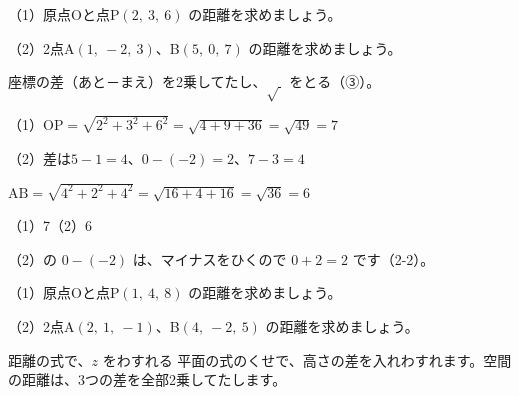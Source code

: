 \begin{reidai}
（1）原点Oと点P$(2,\ 3,\ 6)$ の距離を求めましょう。\par
（2）2点A$(1,\ -2,\ 3)$、B$(5,\ 0,\ 7)$ の距離を求めましょう。\par
\kangaekata 座標の差（あと－まえ）を2乗してたし、$\sqrt{\ }$ をとる（③）。\par
\shiki（1）$\mathrm{OP}=\sqrt{2^2+3^2+6^2}=\sqrt{4+9+36}=\sqrt{49}=7$\par
\hspace*{2.6\zw}（2）差は\enspace $5-1=4$、\enspace $0-(-2)=2$、\enspace $7-3=4$\par
\hspace*{4.6\zw}$\mathrm{AB}=\sqrt{4^2+2^2+4^2}=\sqrt{16+4+16}=\sqrt{36}=6$\par
\kotae （1）7\quad（2）6
\end{reidai}
（2）の $0-(-2)$ は、マイナスをひくので $0+2=2$ です（2-2）。

\begin{jibun}
（1）原点Oと点P$(1,\ 4,\ 8)$ の距離を求めましょう。\par
（2）2点A$(2,\ 1,\ -1)$、B$(4,\ -2,\ 5)$ の距離を求めましょう。
\end{jibun}

\begin{tsumazuki}{距離の式で、$z$ をわすれる}
平面の式のくせで、高さの差を入れわすれます。空間の距離は、3つの差を全部2乗してたします。
\end{tsumazuki}

